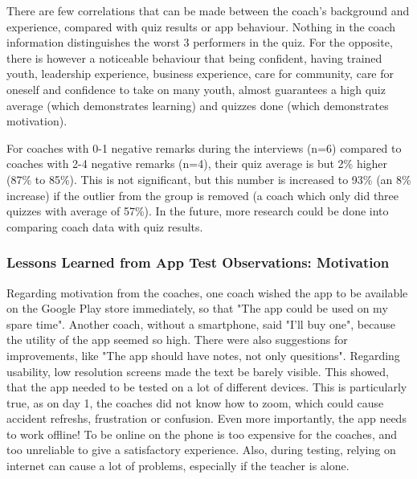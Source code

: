     There are few correlations that can be made between the coach's background and experience, compared with quiz results or app behaviour. Nothing in the coach information distinguishes the worst 3 performers in the quiz. For the opposite, there is however a noticeable behaviour that being confident, having trained youth, leadership experience, business experience, care for community, care for oneself and confidence to take on many youth, almost guarantees a high quiz average (which demonstrates learning) and quizzes done (which demonstrates motivation).

    For coaches with 0-1 negative remarks during the interviews (n=6) compared to coaches with 2-4 negative remarks (n=4), their quiz average is but 2\% higher (87\% to 85\%). This is not significant, but this number is increased to 93\% (an 8\% increase) if the outlier from the group is removed (a coach which only did three quizzes with average of 57\%). In the future, more research could be done into comparing coach data with quiz results.


    \subsubsection{Lessons Learned from App Test Observations: Motivation}
Regarding motivation from the coaches, one coach wished the app to be available on the Google Play store immediately, so that "The app could be used on my spare time". Another coach, without a smartphone, said "I'll buy one", because the utility of the app seemed so high. There were also suggestions for improvements, like "The app should have notes, not only quesitions". Regarding usability, low resolution screens made the text be barely visible. This showed, that the app needed to be tested on a lot of different devices. This is particularly true, as on day 1, the coaches did not know how to zoom, which could cause accident refreshs, frustration or confusion. Even more importantly, the app needs to work offline! To be online on the phone is too expensive for the coaches, and too unreliable to give a satisfactory experience. Also, during testing, relying on internet can cause a lot of problems, especially if the teacher is alone.

